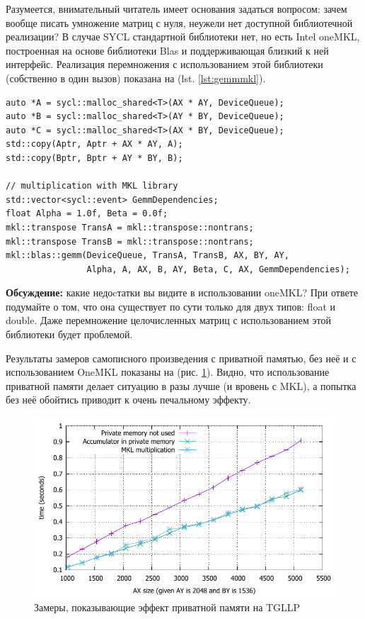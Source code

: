 \documentclass[a4paper,12pt,oneside]{article}
\begin{document}
Разумеется, внимательный читатель имеет основания задаться вопросом: зачем вообще писать умножение матриц с нуля, неужели нет доступной библиотечной реализации?
В случае SYCL стандартной библиотеки нет, но есть Intel oneMKL, построенная на основе библиотеки Blas и поддерживающая близкий к ней интерфейс.
Реализация перемножения с использованием этой библиотеки (собственно в один вызов) показана на (lst. \ref{lst:gemmmkl}).

\begin{lstlisting}[caption={Перемножение матриц с использованием библиотеки MKL},label={lst:gemmmkl}]
auto *A = sycl::malloc_shared<T>(AX * AY, DeviceQueue);
auto *B = sycl::malloc_shared<T>(AY * BY, DeviceQueue);
auto *C = sycl::malloc_shared<T>(AX * BY, DeviceQueue);
std::copy(Aptr, Aptr + AX * AY, A);
std::copy(Bptr, Bptr + AY * BY, B);

// multiplication with MKL library
std::vector<sycl::event> GemmDependencies;
float Alpha = 1.0f, Beta = 0.0f;
mkl::transpose TransA = mkl::transpose::nontrans;
mkl::transpose TransB = mkl::transpose::nontrans;
mkl::blas::gemm(DeviceQueue, TransA, TransB, AX, BY, AY,
                Alpha, A, AX, B, AY, Beta, C, AX, GemmDependencies);
\end{lstlisting}

\textbf{Обсуждение:} какие недоcтатки вы видите в использовании oneMKL?
При ответе подумайте о том, что она существует по сути только для двух типов: float и double.
Даже перемножение целочисленных матриц с использованием этой библиотеки будет проблемой.

Результаты замеров самописного произведения с приватной памятью, без неё и с использованием OneMKL показаны на (рис. \ref{fig:sgemm_priv}). Видно, что использование приватной памяти делает ситуацию в разы лучше (и вровень с MKL), а попытка без неё обойтись приводит к очень печальному эффекту.

\begin{figure}
\centering
\includegraphics[width=1.0\textwidth]{pictures/sgemm_priv.pdf}
\caption{Замеры, показывающие эффект приватной памяти на TGLLP}
\label{fig:sgemm_priv}
\end{figure}
\end{document}
